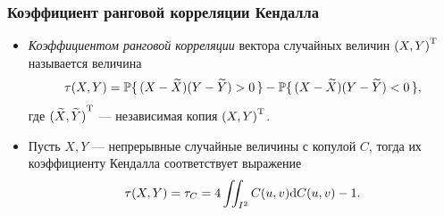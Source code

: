 \documentclass[11pt]{beamer}
\begin{document}
\begin{frame}
\frametitle{Коэффициент ранговой корреляции Кендалла}
\begin{itemize}
  \item \emph{Коэффициентом ранговой корреляции} вектора случайных величин $\trans{(X, Y)}$ называется величина
\begin{equation}
  \tau(X, Y) = \P\{\, (X - \widetilde{X})(Y - \widetilde{Y}) > 0 \,\} - \P\{\, (X - \widetilde{X})(Y - \widetilde{Y}) < 0 \,\},
\end{equation}
где $\trans{(\widetilde{X}, \widetilde{Y})}$ --- независимая копия $\trans{(X, Y)}$. \par

\item Пусть $X, Y$ --- непрерывные случайные величины с копулой $C$, тогда их коэффициенту Кендалла соответствует выражение
  \[
  \tau(X, Y) = \tau_C = 4 \iint_{I^2} C(u, v) \d C(u,v) - 1.
  \]
\end{itemize}
\end{frame}
\end{document}
